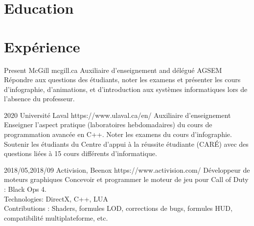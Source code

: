 \documentclass[10pt]{article} %
\begin{document}
\section{Education}







\section{Expérience}
\job
{}{Present}
{McGill}
{mcgill.ca}
{Auxiliaire d'enseignement and délégué AGSEM}
{Répondre aux questions des étudiants, noter les examens et présenter les cours d'infographie,
d'animations, et d'introduction aux systèmes informatiques lors de l'absence du professeur.}

\job
{}{2020}
{Université Laval}
{https://www.ulaval.ca/en/}
{Auxiliaire d'enseignement}
{Enseigner l'aspect pratique (laboratoires hebdomadaires) du cours de programmation avancée en C++. Noter les examens du cours d'infographie. Soutenir les étudiants du Centre d'appui à la réussite étudiante (CARÉ) avec des questions liées à 15 cours différents d'informatique.}

\job
{2018/05,}{2018/09}
{Activision, Beenox}
{https://www.activision.com/}
{Développeur de moteurs graphiques}
{Concevoir et programmer le moteur de jeu pour Call of Duty : Black Ops 4.\\
 Technologies: DirectX, C++, LUA \\
 Contributions : Shaders, formules LOD, corrections de bugs, formules HUD, compatibilité multiplateforme, etc.}
\end{document}
